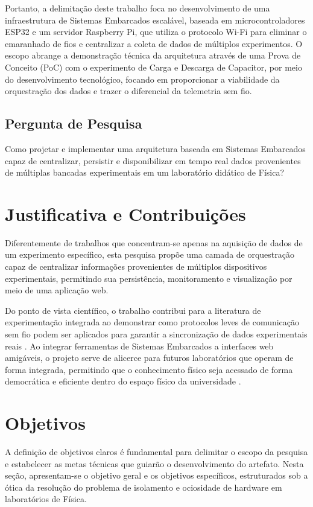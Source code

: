 Portanto, a delimitação deste trabalho foca no desenvolvimento de uma infraestrutura de Sistemas Embarcados escalável, baseada em microcontroladores ESP32 e um servidor Raspberry Pi, que utiliza o protocolo Wi-Fi para eliminar o emaranhado de fios e centralizar a coleta de dados de múltiplos experimentos. O escopo abrange a demonstração técnica da arquitetura através de uma Prova de Conceito (PoC) com o experimento de Carga e Descarga de Capacitor, por meio do desenvolvimento tecnológico, focando em proporcionar a viabilidade da orquestração dos dados e trazer o diferencial da telemetria sem fio.

\subsection{Pergunta de Pesquisa}
Como projetar e implementar uma arquitetura baseada em Sistemas Embarcados capaz de centralizar, persistir e disponibilizar em tempo real dados provenientes de múltiplas bancadas experimentais em um laboratório didático de Física?

\section{Justificativa e Contribuições}
Diferentemente de trabalhos que concentram-se apenas na aquisição de dados de um experimento específico, esta pesquisa propõe uma camada de orquestração capaz de centralizar informações provenientes de múltiplos dispositivos experimentais, permitindo sua persistência, monitoramento e visualização por meio de uma aplicação web.

Do ponto de vista científico, o trabalho contribui para a literatura de experimentação integrada ao demonstrar como protocolos leves de comunicação sem fio podem ser aplicados para garantir a sincronização de dados experimentais reais \cite{lms}. Ao integrar ferramentas de Sistemas Embarcados a interfaces web amigáveis, o projeto serve de alicerce para futuros laboratórios que operam de forma integrada, permitindo que o conhecimento físico seja acessado de forma democrática e eficiente dentro do espaço físico da universidade \cite{termometria}.

\section{Objetivos}
A definição de objetivos claros é fundamental para delimitar o escopo da pesquisa e estabelecer as metas técnicas que guiarão o desenvolvimento do artefato. Nesta seção, apresentam-se o objetivo geral e os objetivos específicos, estruturados sob a ótica da resolução do problema de isolamento e ociosidade de hardware em laboratórios de Física.

